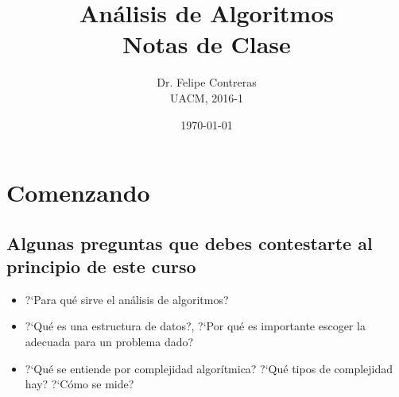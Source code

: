 \documentclass[11pt]{amsart}
\title{Análisis de Algoritmos\\Notas de Clase}
\author{Dr. Felipe Contreras\\UACM, 2016-1}
\date{\today}                                         %
\begin{document}
\maketitle
\section{Comenzando}

\subsection{Algunas preguntas que debes contestarte al principio de este curso}

\begin{itemize}
\item ?`Para qué sirve el análisis de algoritmos?
\item ?`Qué es una estructura de datos?, ?`Por qué es importante escoger la adecuada para un problema dado?
\item ?`Qué se entiende por complejidad algorítmica? ?`Qué tipos de complejidad hay? ?`Cómo se mide?
\end{itemize}
\end{document}
